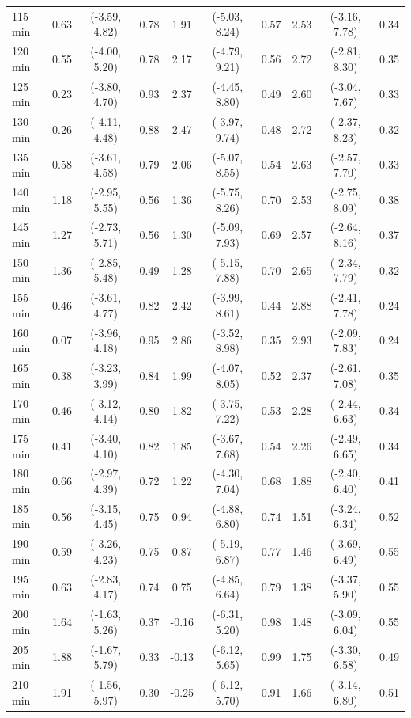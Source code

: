 \begin{table}[ht]
{\begin{tabular}{lccccccccc}
115 min & 0.63 & (-3.59, 4.82) & 0.78 & 1.91 & (-5.03, 8.24) & 0.57 & 2.53 & (-3.16, 7.78) & 0.34 \\
120 min & 0.55 & (-4.00, 5.20) & 0.78 & 2.17 & (-4.79, 9.21) & 0.56 & 2.72 & (-2.81, 8.30) & 0.35 \\
125 min & 0.23 & (-3.80, 4.70) & 0.93 & 2.37 & (-4.45, 8.80) & 0.49 & 2.60 & (-3.04, 7.67) & 0.33 \\
130 min & 0.26 & (-4.11, 4.48) & 0.88 & 2.47 & (-3.97, 9.74) & 0.48 & 2.72 & (-2.37, 8.23) & 0.32 \\
135 min & 0.58 & (-3.61, 4.58) & 0.79 & 2.06 & (-5.07, 8.55) & 0.54 & 2.63 & (-2.57, 7.70) & 0.33 \\
140 min & 1.18 & (-2.95, 5.55) & 0.56 & 1.36 & (-5.75, 8.26) & 0.70 & 2.53 & (-2.75, 8.09) & 0.38 \\
145 min & 1.27 & (-2.73, 5.71) & 0.56 & 1.30 & (-5.09, 7.93) & 0.69 & 2.57 & (-2.64, 8.16) & 0.37 \\
150 min & 1.36 & (-2.85, 5.48) & 0.49 & 1.28 & (-5.15, 7.88) & 0.70 & 2.65 & (-2.34, 7.79) & 0.32 \\
155 min & 0.46 & (-3.61, 4.77) & 0.82 & 2.42 & (-3.99, 8.61) & 0.44 & 2.88 & (-2.41, 7.78) & 0.24 \\
160 min & 0.07 & (-3.96, 4.18) & 0.95 & 2.86 & (-3.52, 8.98) & 0.35 & 2.93 & (-2.09, 7.83) & 0.24 \\
165 min & 0.38 & (-3.23, 3.99) & 0.84 & 1.99 & (-4.07, 8.05) & 0.52 & 2.37 & (-2.61, 7.08) & 0.35 \\
170 min & 0.46 & (-3.12, 4.14) & 0.80 & 1.82 & (-3.75, 7.22) & 0.53 & 2.28 & (-2.44, 6.63) & 0.34 \\
175 min & 0.41 & (-3.40, 4.10) & 0.82 & 1.85 & (-3.67, 7.68) & 0.54 & 2.26 & (-2.49, 6.65) & 0.34 \\
180 min & 0.66 & (-2.97, 4.39) & 0.72 & 1.22 & (-4.30, 7.04) & 0.68 & 1.88 & (-2.40, 6.40) & 0.41 \\
185 min & 0.56 & (-3.15, 4.45) & 0.75 & 0.94 & (-4.88, 6.80) & 0.74 & 1.51 & (-3.24, 6.34) & 0.52 \\
190 min & 0.59 & (-3.26, 4.23) & 0.75 & 0.87 & (-5.19, 6.87) & 0.77 & 1.46 & (-3.69, 6.49) & 0.55 \\
195 min & 0.63 & (-2.83, 4.17) & 0.74 & 0.75 & (-4.85, 6.64) & 0.79 & 1.38 & (-3.37, 5.90) & 0.55 \\
200 min & 1.64 & (-1.63, 5.26) & 0.37 & -0.16 & (-6.31, 5.20) & 0.98 & 1.48 & (-3.09, 6.04) & 0.55 \\
205 min & 1.88 & (-1.67, 5.79) & 0.33 & -0.13 & (-6.12, 5.65) & 0.99 & 1.75 & (-3.30, 6.58) & 0.49 \\
210 min & 1.91 & (-1.56, 5.97) & 0.30 & -0.25 & (-6.12, 5.70) & 0.91 & 1.66 & (-3.14, 6.80) & 0.51 \\
\bottomrule
\end{tabular}%
}
\end{table}
